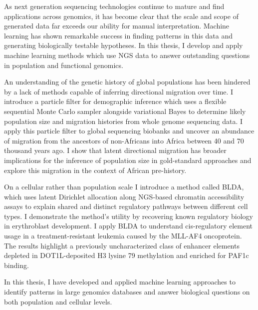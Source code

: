 As next generation sequencing technologies continue to mature and find applications across genomics, it has become clear that the scale and scope of generated data far exceeds our ability for manual interpretation. Machine learning has shown remarkable success in finding patterns in this data and generating biologically testable hypotheses. In this thesis, I develop and apply machine learning methods which use NGS data to answer outstanding questions in population and functional genomics.

An understanding of the genetic history of global populations has been hindered by a lack of methods capable of inferring directional migration over time. 
I introduce a particle filter for demographic inference which uses a flexible sequential Monte Carlo sampler alongside variational Bayes to determine likely population size and migration histories from whole genome sequencing data. I apply this particle filter to global sequencing biobanks and uncover an abundance of migration from the ancestors of non-Africans into Africa between 40 and 70 thousand years ago. I show that latent directional migration has broader implications for the inference of population size in gold-standard approaches and explore this migration in the context of African pre-history.

On a cellular rather than population scale I introduce a method called BLDA, which uses latent Dirichlet allocation along NGS-based chromatin accessibility assays to explain shared and distinct regulatory pathways between different cell types. I demonstrate the method's utility by recovering known regulatory biology in erythroblast development. I apply BLDA to understand cis-regulatory element usage in a treatment-resistant leukemia caused by the MLL-AF4 oncoprotein. The results highlight a previously uncharacterized class of enhancer elements depleted in DOT1L-deposited H3 lysine 79 methylation and enriched for PAF1c binding. 

In this thesis, I have developed and applied machine learning approaches to identify patterns in large genomics databases and answer biological questions on both population and cellular levels. 